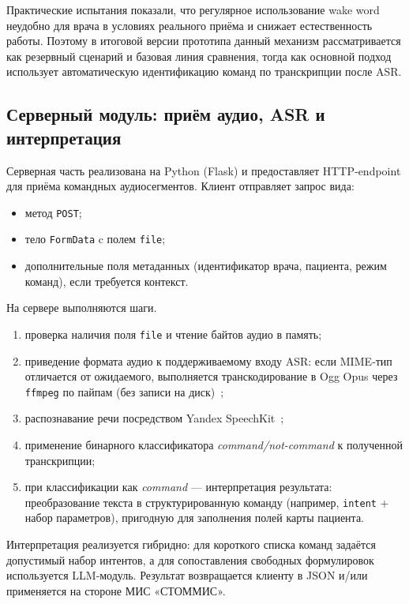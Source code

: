 Практические испытания показали, что регулярное использование wake word неудобно для врача в условиях реального приёма и снижает естественность работы.
Поэтому в итоговой версии прототипа данный механизм рассматривается как резервный сценарий и базовая линия сравнения, тогда как основной подход использует автоматическую идентификацию команд по транскрипции после ASR.

\subsection{Серверный модуль: приём аудио, ASR и интерпретация}
\label{subsec:task3}

Серверная часть реализована на Python (Flask) и предоставляет HTTP‑endpoint для приёма командных аудиосегментов.
Клиент отправляет запрос вида:
\begin{itemize}
    \item метод \texttt{POST};
    \item тело \texttt{FormData} c полем \texttt{file};
    \item дополнительные поля метаданных (идентификатор врача, пациента, режим команд), если требуется контекст.
\end{itemize}

На сервере выполняются шаги.
\begin{enumerate}
    \item проверка наличия поля \texttt{file} и чтение байтов аудио в память;
    \item приведение формата аудио к поддерживаемому входу ASR: если MIME‑тип отличается от ожидаемого, выполняется транскодирование в Ogg Opus через \texttt{ffmpeg} по пайпам (без записи на диск)~\cite{FFmpeg};
    \item распознавание речи посредством Yandex SpeechKit~\cite{YandexSpeechKit};
    \item применение бинарного классификатора \textit{command/not-command} к полученной транскрипции;
    \item при классификации как \textit{command} --- интерпретация результата: преобразование текста в структурированную команду (например, \texttt{intent} + набор параметров), пригодную для заполнения полей карты пациента.
\end{enumerate}

Интерпретация реализуется гибридно: для короткого списка команд задаётся допустимый набор интентов, а для сопоставления свободных формулировок используется LLM‑модуль.
Результат возвращается клиенту в JSON и/или применяется на стороне МИС «СТОММИС».

